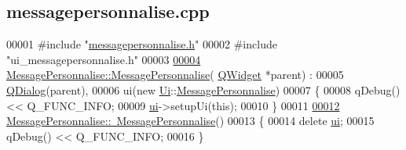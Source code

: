 \hypertarget{messagepersonnalise_8cpp_source}{}\subsection{messagepersonnalise.\+cpp}

\begin{DoxyCode}
00001 \textcolor{preprocessor}{#include "\hyperlink{messagepersonnalise_8h}{messagepersonnalise.h}"}
00002 \textcolor{preprocessor}{#include "ui\_messagepersonnalise.h"}
00003 
\hyperlink{class_message_personnalise_ac36a9573287d1119566790a4fad25dbc}{00004} \hyperlink{class_message_personnalise_ac36a9573287d1119566790a4fad25dbc}{MessagePersonnalise::MessagePersonnalise}(
      \hyperlink{class_q_widget}{QWidget} *parent) :
00005     \hyperlink{class_q_dialog}{QDialog}(parent),
00006     ui(new \hyperlink{namespace_ui}{Ui}::\hyperlink{class_message_personnalise}{MessagePersonnalise})
00007 \{
00008      qDebug() << Q\_FUNC\_INFO;
00009     \hyperlink{class_message_personnalise_a94bdf252f3e858ec1c2ed354d31a91e3}{ui}->setupUi(\textcolor{keyword}{this});
00010 \}
00011 
\hyperlink{class_message_personnalise_aff9181649ac956114f02660582e86cfc}{00012} \hyperlink{class_message_personnalise_aff9181649ac956114f02660582e86cfc}{MessagePersonnalise::~MessagePersonnalise}()
00013 \{
00014     \textcolor{keyword}{delete} \hyperlink{class_message_personnalise_a94bdf252f3e858ec1c2ed354d31a91e3}{ui};
00015     qDebug() << Q\_FUNC\_INFO;
00016 \}
\end{DoxyCode}
